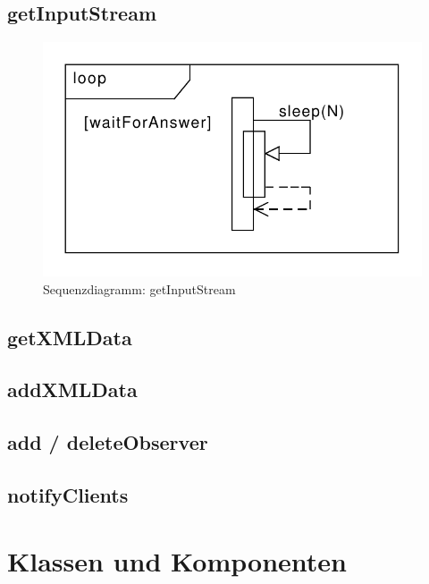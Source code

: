 \subsection {getInputStream}
\begin{figure}[h]
	\centering
	\label{design:dia:sqc:getInputStream}
	\includegraphics[width=\textwidth]{design/frontend/sequence/get-input-stream-sequence.pdf}
	\caption{Sequenzdiagramm: getInputStream}
\end{figure}

\subsection {getXMLData}

\subsection {addXMLData}

\subsection {add / deleteObserver}

\subsection {notifyClients}

\section{Klassen und Komponenten}
